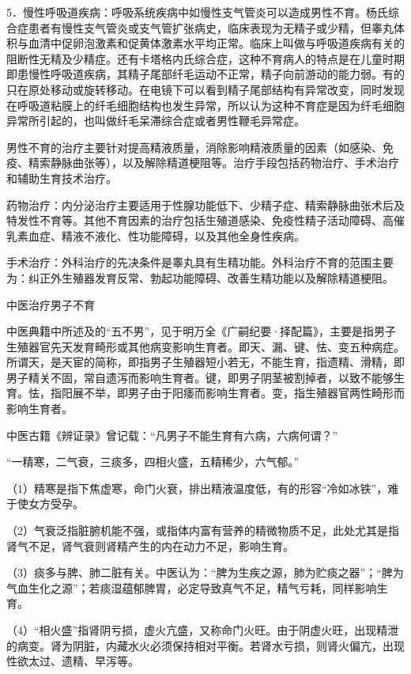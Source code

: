 \documentclass[12pt,UTF8,openany]{ctexbook}
\begin{document}
5．慢性呼吸道疾病：呼吸系统疾病中如慢性支气管炎可以造成男性不育。杨氏综合症患者有慢性支气管炎或支气管扩张病史，临床表现为无精子或少精，但睾丸体积与血清中促卵泡激素和促黄体激素水平均正常。临床上叫做与呼吸道疾病有关的阻断性无精及少精症。还有卡塔格内氏综合症，这种不育病人的特点是在儿童时期即患慢性呼吸道疾病，其精子尾部纤毛运动不正常，精子向前游动的能力弱。有的只在原处移动或旋转移动。在电镜下可以看到精子尾部结构有异常改变，同时发现在呼吸道粘膜上的纤毛细胞结构也发生异常，所以认为这种不育症是因为纤毛细胞异常所引起的，也叫做纤毛呆滞综合症或者男性鞭毛异常症。

男性不育的治疗主要针对提高精液质量，消除影响精液质量的因素（如感染、免疫、精索静脉曲张等），以及解除精道梗阻等。治疗手段包括药物治疗、手术治疗和辅助生育技术治疗。

药物治疗：内分泌治疗主要适用于性腺功能低下、少精子症、精索静脉曲张术后及特发性不育等。其他不育因素的治疗包括生殖道感染、免疫性精子活动障碍、高催乳素血症、精液不液化、性功能障碍，以及其他全身性疾病。

手术治疗：外科治疗的先决条件是睾丸具有生精功能。外科治疗不育的范围主要为：纠正外生殖器发育反常、勃起功能障碍、改善生精功能以及解除精道梗阻。





中医治疗男子不育


中医典籍中所述及的“五不男”，见于明万全《广嗣纪要·择配篇》，主要是指男子生殖器官先天发育畸形或其他病变影响生育者。即天、漏、键、怯、变五种病症。所谓天，是天宦的简称，即指男子生殖器短小若无，不能生育，指遗精、滑精，即男子精关不固，常自遗泻而影响生育者。键，即男子阴茎被割掉者，以致不能够生育。怯，指阳展不举，即男子由于阳痿而影响生育者。变，指生殖器官两性畸形而影响生育者。

中医古籍《辨证录》曾记载：“凡男子不能生育有六病，六病何谓？”

“一精寒，二气衰，三痰多，四相火盛，五精稀少，六气郁。”

（1）精寒是指下焦虚寒，命门火衰，排出精液温度低，有的形容“冷如冰铁”，难于使女方受孕。

（2）气衰泛指脏腑机能不强，或指体内富有营养的精微物质不足，此处尤其是指肾气不足，肾气衰则肾精产生的内在动力不足，影响生育。

（3）痰多与脾、肺二脏有关。中医认为：“脾为生疾之源，肺为贮痰之器”；“脾为气血生化之源”；若痰湿蕴郁脾胃，必定导致真气不足，精气亏耗，同样影响生育。

（4）“相火盛”指肾阴亏损，虚火亢盛，又称命门火旺。由于阴虚火旺，出现精泄的病变。肾为阴脏，内藏水火必须保持相对平衡。若肾水亏损，则肾火偏亢，出现性欲太过、遗精、早泻等。
\end{document}
